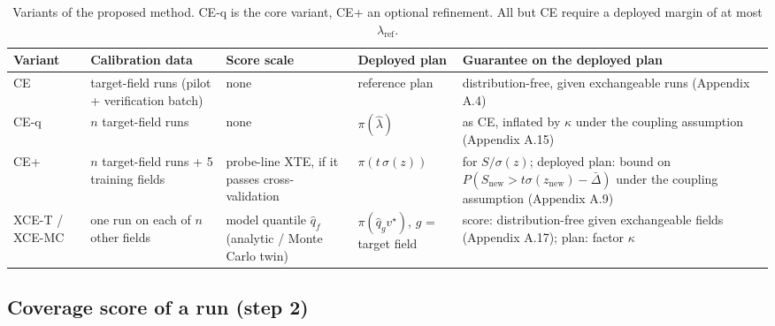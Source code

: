 \documentclass[preprint,12pt,authoryear]{elsarticle}
\begin{document}
\begin{table}[!htbp]
\centering
\footnotesize
\caption{Variants of the proposed method. CE-q is the core variant, CE+ an optional refinement. All but CE require a deployed margin of at most \(\lambda_\mathrm{ref}\).}\label{tab:2}
\begin{tabularx}{\textwidth}{@{}l>{\raggedright\arraybackslash\hsize=1.10\hsize}X>{\raggedright\arraybackslash\hsize=1.10\hsize}X>{\raggedright\arraybackslash\hsize=0.69\hsize}X>{\raggedright\arraybackslash\hsize=1.10\hsize}X@{}}
\toprule
\textbf{Variant} & \textbf{Calibration data} & \textbf{Score scale} & \textbf{Deployed plan} & \textbf{Guarantee on the deployed plan} \\
\midrule
CE & target-field runs (pilot + verification batch) & none & reference plan & distribution-free, given exchangeable runs (Appendix A.4) \\
CE-q & \(n\) target-field runs & none & \(\pi(\hat\lambda)\) & as CE, inflated by \(\kappa\) under the coupling assumption (Appendix A.15) \\
CE+ & \(n\) target-field runs + 5 training fields & probe-line XTE, if it passes cross-validation & \(\pi(t\,\sigma(z))\) & for \(S/\sigma(z)\); deployed plan: bound on \(P(S_\mathrm{new}>t\sigma(z_\mathrm{new})-\bar\Delta)\) under the coupling assumption (Appendix A.9) \\
XCE-T / XCE-MC & one run on each of \(n\) other fields & model quantile \(\hat q_f\) (analytic / Monte Carlo twin) & \(\pi(\hat q_g v^\star)\), \(g\) = target field & score: distribution-free given exchangeable fields (Appendix A.17); plan: factor \(\kappa\) \\
\bottomrule
\end{tabularx}
\end{table}

\subsection{Coverage score of a run (step 2)}
\end{document}
